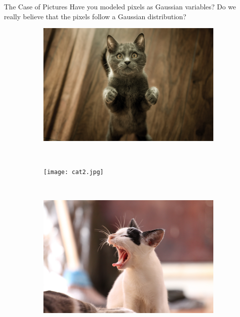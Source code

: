 \documentclass[14pt]{beamer}
\begin{document}
\begin{frame}{The Case of Pictures}
Have you modeled pixels as Gaussian variables?
Do we really believe that the pixels follow a Gaussian distribution?
\begin{figure}
\begin{subfigure}{.3\textwidth}
\includegraphics[scale=.02]{cat1.jpg} 
\end{subfigure}
~
\begin{subfigure}{.3\textwidth}
\texttt{[image: cat2.jpg]} 
\end{subfigure}
~
\begin{subfigure}{.3\textwidth}
\includegraphics[scale=.02]{cat3.jpg} 
\end{subfigure}
\end{figure}
\end{frame}

\begin{frame}

\end{frame}
\end{document}
